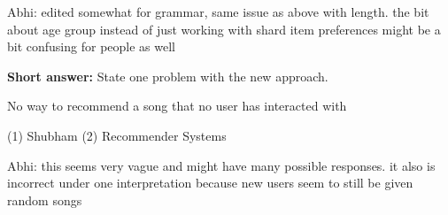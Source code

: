\begin{parts}
\begin{subparts}
\begin{qauthor}
    Abhi: edited somewhat for grammar, same issue as above with length. the bit about age group instead of just working with shard item preferences might be a bit confusing for people as well
    \end{qauthor}


\subpart[2] \textbf{Short answer:} State one problem with the new approach.
    \fillwithlines{8em}
    
    \begin{soln}
    No way to recommend a song that no user has interacted with
    \end{soln}
    \begin{qauthor}
    (1) Shubham (2) Recommender Systems
    
    Abhi: this seems very vague and might have many possible responses. it also is incorrect under one interpretation because new users seem to still be given random songs
    \end{qauthor}    
\end{subparts}
    
\end{parts}
